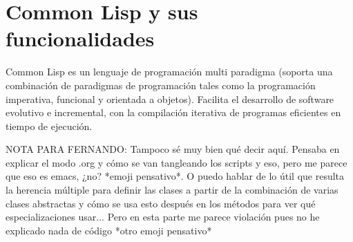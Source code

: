 \section{Common Lisp y sus funcionalidades}\label{2-Lisp}
Common Lisp es un lenguaje de programación multi paradigma (soporta una combinación de paradigmas de programación tales como la programación imperativa, funcional y orientada a objetos). Facilita el desarrollo de software evolutivo e incremental, con la compilación iterativa de programas eficientes en tiempo de ejecución.

NOTA PARA FERNANDO: Tampoco sé muy bien qué decir aquí. Pensaba en explicar el modo .org y cómo se van tangleando los scripts y eso, pero me parece que eso es emacs, ¿no? *emoji pensativo*. O puedo hablar de lo útil que resulta la herencia múltiple para definir las clases a partir de la combinación de varias clases abstractas y cómo se usa esto después en los métodos para ver qué especializaciones usar... Pero en esta parte me parece violación pues no he explicado nada de código *otro emoji pensativo*



























